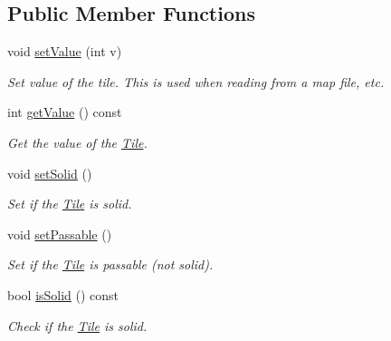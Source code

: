 \subsection*{Public Member Functions}
\begin{DoxyCompactItemize}
\item 
void \hyperlink{classTile_ae3d9e4ace265389dd0e0cf3d62ad6ff3}{set\+Value} (int v)\hypertarget{classTile_ae3d9e4ace265389dd0e0cf3d62ad6ff3}{}\label{classTile_ae3d9e4ace265389dd0e0cf3d62ad6ff3}

\begin{DoxyCompactList}\small\item\em Set value of the tile. This is used when reading from a map file, etc. \end{DoxyCompactList}\item 
int \hyperlink{classTile_aa426a6476fcf257bd0f79da4c3ed06aa}{get\+Value} () const \hypertarget{classTile_aa426a6476fcf257bd0f79da4c3ed06aa}{}\label{classTile_aa426a6476fcf257bd0f79da4c3ed06aa}

\begin{DoxyCompactList}\small\item\em Get the value of the \hyperlink{classTile}{Tile}. \end{DoxyCompactList}\item 
void \hyperlink{classTile_a3deac8e6d0ebd7b8352248201d264c38}{set\+Solid} ()\hypertarget{classTile_a3deac8e6d0ebd7b8352248201d264c38}{}\label{classTile_a3deac8e6d0ebd7b8352248201d264c38}

\begin{DoxyCompactList}\small\item\em Set if the \hyperlink{classTile}{Tile} is solid. \end{DoxyCompactList}\item 
void \hyperlink{classTile_a067099478c20b3f2fb56bc1c042a1e4e}{set\+Passable} ()\hypertarget{classTile_a067099478c20b3f2fb56bc1c042a1e4e}{}\label{classTile_a067099478c20b3f2fb56bc1c042a1e4e}

\begin{DoxyCompactList}\small\item\em Set if the \hyperlink{classTile}{Tile} is passable (not solid). \end{DoxyCompactList}\item 
bool \hyperlink{classTile_a8e67a56637124f73f3da572178dd4838}{is\+Solid} () const \hypertarget{classTile_a8e67a56637124f73f3da572178dd4838}{}\label{classTile_a8e67a56637124f73f3da572178dd4838}

\begin{DoxyCompactList}\small\item\em Check if the \hyperlink{classTile}{Tile} is solid. \end{DoxyCompactList}\end{DoxyCompactItemize}
